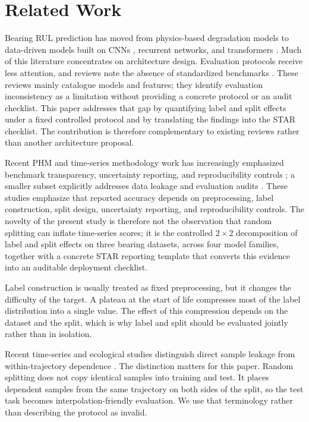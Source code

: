 \documentclass[pdflatex,sn-mathphys-num]{sn-jnl}
\begin{document}
\section{Related Work}
Bearing RUL prediction has moved from physics-based degradation models \cite{paris1963critical,kotzalas2004fatigue,li2022physics} to data-driven models built on CNNs \cite{ince2016real}, recurrent networks, and transformers \cite{rul_lstm_uq_2022,reg_lstm_2021,transformer_tim_2023}. Much of this literature concentrates on architecture design. Evaluation protocols receive less attention, and reviews note the absence of standardized benchmarks \cite{zhao2021deep,caesarendra2021machine}. These reviews mainly catalogue models and features; they identify evaluation inconsistency as a limitation without providing a concrete protocol or an audit checklist. This paper addresses that gap by quantifying label and split effects under a fixed controlled protocol and by translating the findings into the STAR checklist. The contribution is therefore complementary to existing reviews rather than another architecture proposal.

Recent PHM and time-series methodology work has increasingly emphasized benchmark transparency, uncertainty reporting, and reproducibility controls \cite{phmconf2025rethinking,review2020bearing,mst2024cqr,icsrs2023splitconformal,phme2026conformal,ress2022bayesian,eaai2025explainable}; a smaller subset explicitly addresses data leakage and evaluation audits \cite{leakage_nature,leakage_frontiers}. These studies emphasize that reported accuracy depends on preprocessing, label construction, split design, uncertainty reporting, and reproducibility controls. The novelty of the present study is therefore not the observation that random splitting can inflate time-series scores; it is the controlled $2\times 2$ decomposition of label and split effects on three bearing datasets, across four model families, together with a concrete STAR reporting template that converts this evidence into an auditable deployment checklist.

Label construction is usually treated as fixed preprocessing, but it changes the difficulty of the target. A plateau at the start of life compresses most of the label distribution into a single value. The effect of this compression depends on the dataset and the split, which is why label and split should be evaluated jointly rather than in isolation.

Recent time-series and ecological studies distinguish direct sample leakage from within-trajectory dependence \cite{leakage_nature,leakage_frontiers}. The distinction matters for this paper. Random splitting does not copy identical samples into training and test. It places dependent samples from the same trajectory on both sides of the split, so the test task becomes interpolation-friendly evaluation. We use that terminology rather than describing the protocol as invalid.
\end{document}
